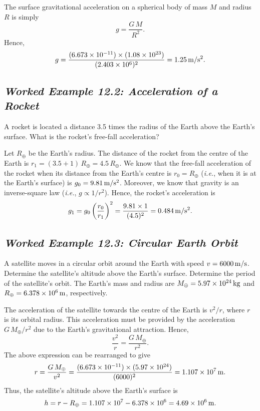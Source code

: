  The surface gravitational acceleration on a spherical body of mass $M$ and radius $R$ is
simply
$$
g = \frac{G\,M}{R^2}.
$$
Hence,
$$
g = \frac{(6.673\times 10^{-11})\times(1.08\times 10^{23})}{(2.403\times 10^6)^2} = 1.25\,{\rm m/s^2}.
$$

\subsection*{\em Worked Example 12.2: Acceleration of a Rocket}
 A rocket is located   a distance 3.5 times the radius of the Earth above the
Earth's surface. What is the rocket's free-fall acceleration?

 Let $R_\oplus$ be the Earth's radius. The distance of the rocket from the
centre of the Earth is $r_1= (3.5+1)\,R_\oplus= 4.5\,R_\oplus$. We know that the free-fall
acceleration of the rocket when its distance from the Earth's centre is $r_0=R_\oplus$ ({\em i.e.}, when it
is at the Earth's surface)
is
$g_0= 9.81\,{\rm m/s^2}$. Moreover, we know that gravity is an inverse-square law ({\em i.e.}, $g\propto 1/r^2$).
Hence, the rocket's acceleration is
$$
g_1 = g_0\left(\frac{r_0}{r_1}\right)^2 = \frac{9.81\times 1}{(4.5)^2} = 0.484\,{\rm m/s^2}.
$$

\subsection*{\em Worked Example 12.3: Circular Earth Orbit}
 A satellite moves in a circular orbit around the Earth with speed
 $v=6000\,{\rm m/s}$. Determine the satellite's altitude above the Earth's surface.
Determine the period of the satellite's orbit. The Earth's mass and radius are
$M_\oplus =5.97\times 10^{24}\,{\rm kg}$ and $R_\oplus = 6.378\times 10^6\,{\rm m}$, 
respectively.

 The acceleration of the satellite towards the centre of the Earth
is $v^2/r$, where $r$ is its orbital radius. This acceleration must be provided by the
 acceleration $G\,M_\oplus/r^2$ due to the Earth's gravitational attraction.
Hence,
$$
\frac{v^2}{r} = \frac{G\,M_\oplus}{r^2}.
$$
The above  expression can be rearranged to give
$$
r = \frac{G\,M_\oplus}{v^2} = \frac{(6.673\times 10^{-11})\times(5.97\times 10^{24})}{(6000)^2} =1.107\times 10^7\,{\rm m}.
$$
Thus, the satellite's altitude above the Earth's surface is
$$
h = r - R_\oplus = 1.107\times 10^7 -  6.378\times 10^6 = 4.69\times 10^6\,{\rm m}.
$$

